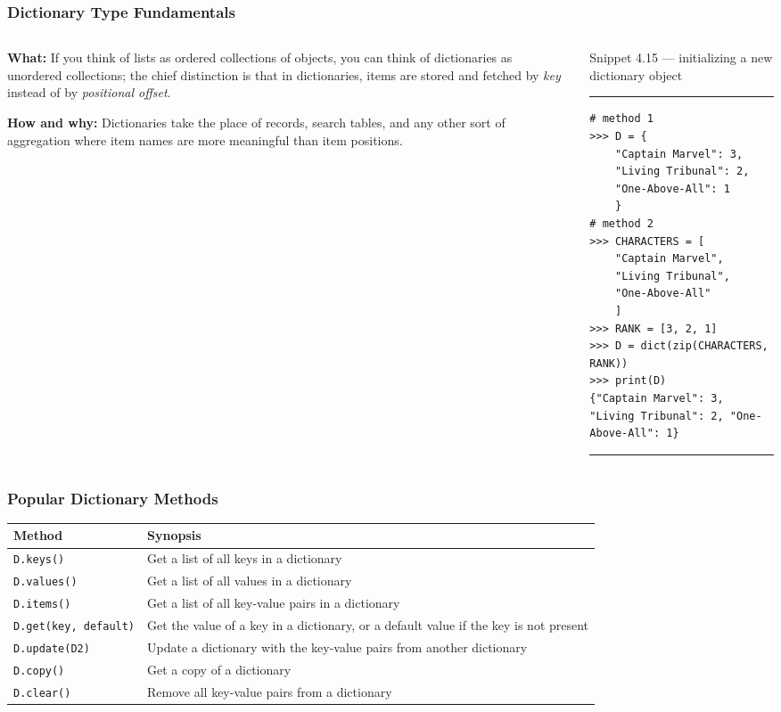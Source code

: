 \documentclass[aspectratio=1610]{beamer}
\begin{document}
\begin{frame}[fragile]
    \frametitle{Dictionary Type Fundamentals}
\begin{columns}
    \begin{column}{0.35\textwidth}
    \quad \textbf{What:} 
    If you think of lists as ordered collections of objects, you can think of dictionaries as unordered collections; the chief distinction is that in dictionaries, items are stored and fetched by \emph{key} instead of by \emph{positional offset}.
    
    \vspace{1em}

    \quad \textbf{How and why:} 
    Dictionaries take the place of records, search tables, and any other sort of aggregation where item names are more meaningful than item positions.
    \end{column}
    \begin{column}{0.6\textwidth}
    \normalsize Snippet 4.15 --- initializing a new dictionary object
    \rule{\textwidth}{1pt}
        \scriptsize
        \begin{verbatim}          
# method 1 
>>> D = {
    "Captain Marvel": 3,
    "Living Tribunal": 2,
    "One-Above-All": 1
    }
# method 2
>>> CHARACTERS = [
    "Captain Marvel",
    "Living Tribunal",
    "One-Above-All"
    ]
>>> RANK = [3, 2, 1]
>>> D = dict(zip(CHARACTERS, RANK)) 
>>> print(D)
{"Captain Marvel": 3, "Living Tribunal": 2, "One-Above-All": 1}
        \end{verbatim}
    \rule{\textwidth}{1pt}
    \end{column}
\end{columns}
\end{frame}

\begin{frame}
    \frametitle{Popular Dictionary Methods}
    \begin{table}[!htbp]
    	\centering
        \small
    	\begin{tabular}{lp{10cm}}
    		\toprule \toprule
    		Method & Synopsis \\
    		\midrule 
    		\texttt{D.keys()} & Get a list of all keys in a dictionary\\
    		\texttt{D.values()} & Get a list of all values in a dictionary\\
    		\texttt{D.items()} & Get a list of all key-value pairs in a dictionary\\
    		\texttt{D.get(key, default)} & Get the value of a key in a dictionary, or a default value if the key is not present\\
    		\texttt{D.update(D2)} & Update a dictionary with the key-value pairs from another dictionary\\
    		\texttt{D.copy()} & Get a copy of a dictionary\\
    		\texttt{D.clear()} & Remove all key-value pairs from a dictionary\\
    		\bottomrule 
    	\end{tabular}
    \end{table}
\end{frame}
\end{document}
